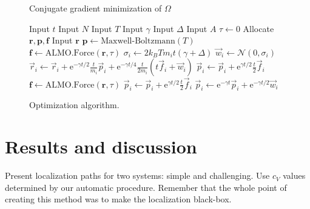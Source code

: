 \documentclass[aps,prl,reprint,amsmath,amssymb]{revtex4-1}
\begin{document}
\begin{figure}
\begin{algorithm}[H]
  \caption{Conjugate gradient minimization of $\Omega$}
  \label{alg:cg}
   \begin{algorithmic}[1]
   	\State Input $t$ 
   	\State Input $N$ 
   	\State Input $T$ 
   	\State Input $\gamma$ 
   	\State Input $\Delta$  \label{line:delta1}
   	\State Input $A$ 
	\State $\tau\gets 0$ 
	\State Allocate $\mathbf{r}, \mathbf{p}, \mathbf{f}$ 
   	\State Input $\mathbf{r}$
	\State $\mathbf{p} \gets \text{Maxwell-Boltzmann}(T)$ 
	\State $\mathbf{f} \gets \text{ALMO.Force}(\mathbf{r},\tau)$ 
	 
		 
			\State $\sigma_i \gets 2 k_B T m_i t (\gamma + \Delta)$  \label{line:delta2}
			\State $\vec{w}_{i} \gets \mathcal{N}(0,\sigma_i)$ 
			\State $\vec{r}_i \gets \vec{r}_i + \mathrm{e}^{-\gamma t/2} \frac{t}{m_i}\vec{p}_i + \mathrm{e}^{-\gamma t/4} \frac{t}{2 m_i} \left( t \vec{f}_i + \vec{w}_i \right) $
			\State $\vec{p}_i \gets \vec{p}_i + \mathrm{e}^{\gamma t/2} \frac{t}{2} \vec{f}_i$ 
		\EndFor
		\State $\mathbf{f} \gets \text{ALMO.Force}(\mathbf{r},\tau)$ 
			\State $\vec{p}_i \gets \vec{p}_i + \mathrm{e}^{\gamma t/2} \frac{t}{2} \vec{f}_i $
			\State $\vec{p}_i \gets \mathrm{e}^{-\gamma t} \vec{p}_i + \mathrm{e}^{-\gamma t/2} \vec{w}_i $   
		\EndFor
	\EndFor
   \end{algorithmic}
\end{algorithm}
\caption{\label{fig:cg} Optimization algorithm.}
\end{figure}


\section{Results and discussion}

Present localization paths for two systems: simple and challenging. Use $c_V$ values determined by our automatic procedure. Remember that the whole point of creating this method was to make the localization black-box.
\end{document}
